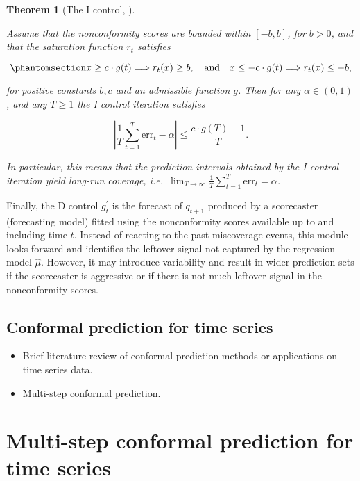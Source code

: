 \documentclass[
  11pt,
  a4paper,
]{article}
\theoremstyle{plain}
\theoremstyle{plain}
\newtheorem{theorem}{Theorem}[section]
\theoremstyle{remark}
\begin{document}
\begin{theorem}[The I control,
\textcite{angelopoulos2024}]\protect\hypertarget{thm-pid_i}{}\label{thm-pid_i}

Assume that the nonconformity scores are bounded within \([-b, b]\), for
\(b>0\), and that the saturation function \(r_t\) satisfies

\begin{equation}\phantomsection\label{eq-saturation}{
x \geq c \cdot g(t) \Longrightarrow r_t(x) \geq b, \quad \text {and} \quad x \leq-c \cdot g(t) \Longrightarrow r_t(x) \leq -b,
}\end{equation}

for positive constants \(b, c\) and an admissible function \(g\). Then
for any \(\alpha \in (0,1)\), and any \(T \geq 1\) the I control
iteration satisfies

\[
|\frac{1}{T}\sum_{t=1}^{T}\mathrm{err}_t - \alpha| \leq \frac{c \cdot g(T)+1}{T}.
\]

In particular, this means that the prediction intervals obtained by the
I control iteration yield long-run coverage,
i.e.~\(\lim _{T \rightarrow \infty} \frac{1}{T} \sum_{t=1}^T \mathrm{err}_t = \alpha\).

\end{theorem}

Finally, the D control \(g_t^{\prime}\) is the forecast of \(q_{t+1}\)
produced by a scorecaster (forecasting model) fitted using the
nonconformity scores available up to and including time \(t\). Instead
of reacting to the past miscoverage events, this module looks forward
and identifies the leftover signal not captured by the regression model
\(\hat{\mu}\). However, it may introduce variability and result in wider
prediction sets if the scorecaster is aggressive or if there is not much
leftover signal in the nonconformity scores.

\subsection{Conformal prediction for time series}\label{sec-review_ts}

\begin{itemize}
\item
  Brief literature review of conformal prediction methods or
  applications on time series data.
\item
  Multi-step conformal prediction.
\end{itemize}

\section{Multi-step conformal prediction for time
series}\label{sec-method}
\end{document}
